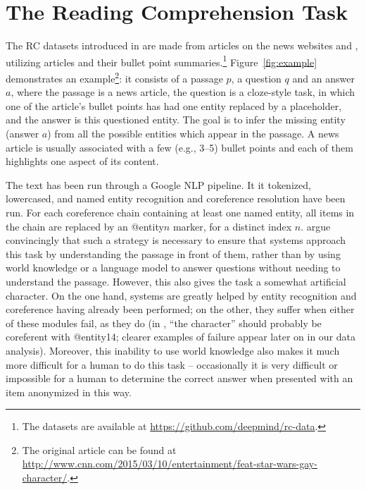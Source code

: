 
\section{The Reading Comprehension Task}


The RC datasets introduced in \cite{hermann2015teaching} are made from articles on the news websites  and , utilizing articles and their bullet point summaries.\footnote{The datasets are available at \url{https://github.com/deepmind/rc-data}.} Figure~\ref{fig:example} demonstrates an example\footnote{The original article can be found at \url{http://www.cnn.com/2015/03/10/entertainment/feat-star-wars-gay-character/}.}: it consists of a passage $p$, a question $q$ and an answer $a$, where the passage is a news article, the question is a cloze-style task, in which one of the article's bullet points has had one entity replaced by a placeholder, and the answer is this questioned entity. The goal is to infer the missing entity (answer $a$) from all the possible entities which appear in the passage. A news article is usually associated with a few (e.g., 3--5) bullet points and each of them highlights one aspect of its content.

The text has been run through a Google NLP pipeline. It it tokenized, lowercased, and named entity recognition and coreference resolution have been run. For each coreference chain containing at least one named entity, all items in the chain are replaced by an @entity$n$ marker, for a distinct index $n$.  argue convincingly that such a strategy is necessary to ensure that systems approach this task by understanding the passage in front of them, rather than by using world knowledge or a language model to answer questions without needing to understand the passage. However, this also gives the task a somewhat artificial character. On the one hand, systems are greatly helped by entity recognition and coreference having already been performed; on the other, they suffer when either of these modules fail, as they do (in , ``the character'' should probably be coreferent with @entity14; clearer examples of failure appear later on in our data analysis). Moreover, this inability to use world knowledge also makes it much more difficult for a human to do this task -- occasionally it is very difficult or impossible for a human to determine the correct answer when presented with an item anonymized in this way.

